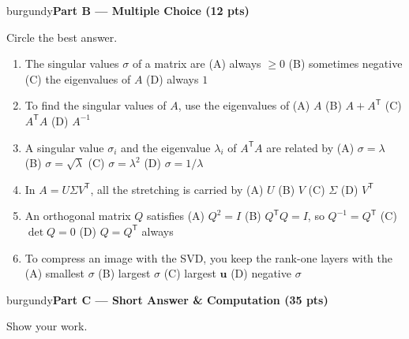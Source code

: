 \documentclass[10pt]{article}
\newcommand{\uu}{\mathbf{u}}
\newcommand{\T}{^{\mathsf T}}
\newcommand{\parthead}[1]{%
  \vspace{6pt}\noindent
  \begin{headlinebox}{burgundy}{\color{white}\bfseries #1}\end{headlinebox}%
  \vspace{4pt}}
\begin{document}
\parthead{Part B --- Multiple Choice (12 pts)}
Circle the best answer.

\begin{enumerate}[leftmargin=1.9em, itemsep=9pt]
  \item The singular values $\sigma$ of a matrix are
    \hfill (A) always $\ge0$ \quad (B) sometimes negative \quad (C) the eigenvalues of $A$ \quad (D) always $1$
  \item To find the singular values of $A$, use the eigenvalues of
    \hfill (A) $A$ \quad (B) $A+A\T$ \quad (C) $A\T A$ \quad (D) $A^{-1}$
  \item A singular value $\sigma_i$ and the eigenvalue $\lambda_i$ of $A\T A$ are related by
    \hfill (A) $\sigma=\lambda$ \quad (B) $\sigma=\sqrt{\lambda}$ \quad (C) $\sigma=\lambda^2$ \quad (D) $\sigma=1/\lambda$
  \item In $A=U\Sigma V\T$, all the stretching is carried by
    \hfill (A) $U$ \quad (B) $V$ \quad (C) $\Sigma$ \quad (D) $V\T$
  \item An orthogonal matrix $Q$ satisfies
    \hfill (A) $Q^2=I$ \quad (B) $Q\T Q=I$, so $Q^{-1}=Q\T$ \quad (C) $\det Q=0$ \quad (D) $Q=Q\T$ always
  \item To compress an image with the SVD, you keep the rank-one layers with the
    \hfill (A) smallest $\sigma$ \quad (B) largest $\sigma$ \quad (C) largest $\uu$ \quad (D) negative $\sigma$
\end{enumerate}

\parthead{Part C --- Short Answer \& Computation (35 pts)}
Show your work.
\end{document}
